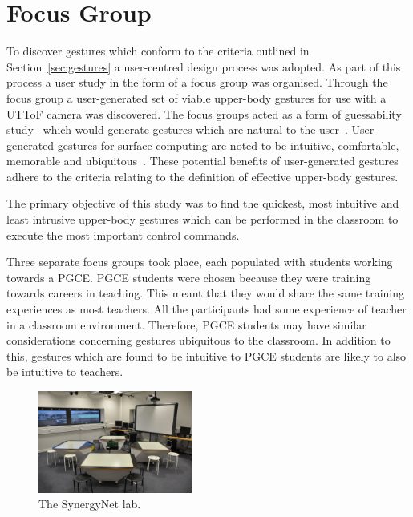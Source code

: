 \documentclass[manuscript, review, screen]{acmart}
\begin{document}
\section{Focus Group}  
\label{sec:focusgroup}

To discover gestures which conform to the criteria outlined in Section~\ref{sec:gestures} a user-centred design process was adopted.
As part of this process a user study in the form of a focus group was organised.
Through the focus group a user-generated set of viable upper-body gestures for use with a \ac{UTToF} camera was discovered.
The focus groups acted as a form of guessability study~\cite{Ruiz2011,Wobbrock2009} which would generate gestures which are natural to the user~\cite{Grandhi2011}.
User-generated gestures for surface computing are noted to be intuitive, comfortable, memorable and ubiquitous~\cite{Bjørneseth2012}.
These potential benefits of user-generated gestures adhere to the criteria relating to the definition of effective upper-body gestures.

The primary objective of this study was to find the quickest, most intuitive and least intrusive upper-body gestures which can be performed in the classroom to execute the most important control commands.

Three separate focus groups took place, each populated with students working towards a \ac{PGCE}.
\ac{PGCE} students were chosen because they were training towards careers in teaching.
This meant that they would share the same training experiences as most teachers.
All the participants had some experience of teacher in a classroom environment.
Therefore, \ac{PGCE} students may have similar considerations concerning gestures ubiquitous to the classroom.
In addition to this, gestures which are found to be intuitive to \ac{PGCE} students are likely to also be intuitive to teachers.

\begin{figure}[h]
   \centering
   \includegraphics[width=0.45\textwidth]{figures/synergynet_lab.png}
   \caption{The SynergyNet lab.}
   \label{fig:synergynetLab}
\end{figure}
\end{document}
